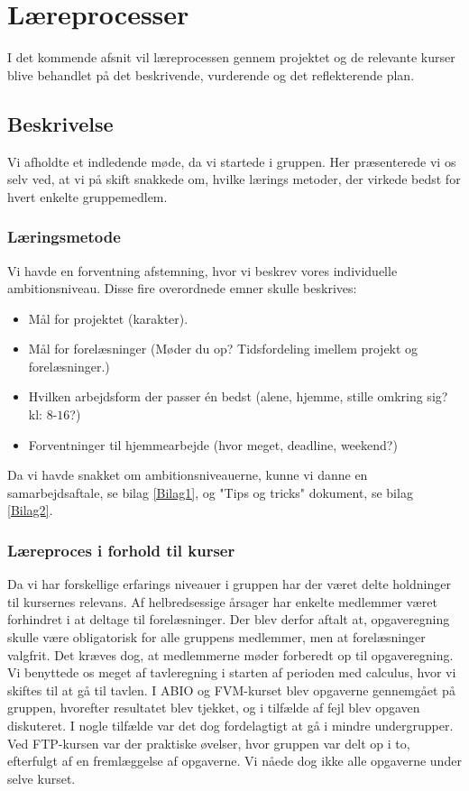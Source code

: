 \chapter{Læreprocesser}
I det kommende afsnit vil læreprocessen gennem projektet og de relevante kurser blive behandlet på det beskrivende, vurderende og det reflekterende plan. 

\section{Beskrivelse}
Vi afholdte et indledende møde, da vi startede i gruppen. Her præsenterede vi os selv ved, at vi på skift snakkede om, hvilke lærings metoder, der virkede bedst for hvert enkelte gruppemedlem.

\subsection{Læringsmetode}
Vi havde en forventning afstemning, hvor vi beskrev vores individuelle ambitionsniveau. Disse fire overordnede emner skulle beskrives:
\begin{itemize}
	\item Mål for projektet (karakter).
	\item Mål for forelæsninger (Møder du op? Tidsfordeling imellem projekt og forelæsninger.)
	\item Hvilken arbejdsform der passer én bedst (alene, hjemme, stille omkring sig? kl: $8$-$16$?)
	\item Forventninger til hjemmearbejde (hvor meget, deadline, weekend?)
\end{itemize}
Da vi havde snakket om ambitionsniveauerne, kunne vi danne en samarbejdsaftale, se bilag \ref{Bilag1}, og "Tips og tricks" dokument, se bilag \ref{Bilag2}.

\subsection{Læreproces i forhold til kurser}
Da vi har forskellige erfarings niveauer i gruppen har der været delte holdninger til kursernes relevans. Af helbredsessige årsager har enkelte medlemmer været forhindret i at deltage til forelæsninger. Der blev derfor aftalt at, opgaveregning skulle være obligatorisk for alle gruppens medlemmer, men at forelæsninger valgfrit. Det kræves dog, at medlemmerne møder forberedt op til opgaveregning. \\
Vi benyttede os meget af tavleregning i starten af perioden med calculus, hvor vi skiftes til at gå til tavlen. I ABIO og FVM-kurset blev opgaverne gennemgået på gruppen, hvorefter resultatet blev tjekket, og i tilfælde af fejl blev opgaven diskuteret. I nogle tilfælde var det dog fordelagtigt at gå i mindre undergrupper. Ved FTP-kursen var der praktiske øvelser, hvor gruppen var delt op i to, efterfulgt af en fremlæggelse af opgaverne. Vi nåede dog ikke alle opgaverne under selve kurset. 
  
